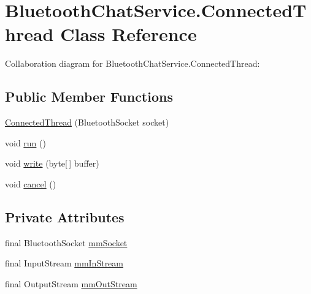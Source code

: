 \hypertarget{classcom_1_1example_1_1android_1_1_bluetooth_chat_1_1_bluetooth_chat_service_1_1_connected_thread}{\section{Bluetooth\-Chat\-Service.\-Connected\-Thread Class Reference}
\label{classcom_1_1example_1_1android_1_1_bluetooth_chat_1_1_bluetooth_chat_service_1_1_connected_thread}
}


Collaboration diagram for Bluetooth\-Chat\-Service.\-Connected\-Thread\-:
\subsection*{Public Member Functions}
\begin{DoxyCompactItemize}
\item 
\hyperlink{classcom_1_1example_1_1android_1_1_bluetooth_chat_1_1_bluetooth_chat_service_1_1_connected_thread_a8dc6fa71066e77167173b4e67439b691}{Connected\-Thread} (Bluetooth\-Socket socket)
\item 
void \hyperlink{classcom_1_1example_1_1android_1_1_bluetooth_chat_1_1_bluetooth_chat_service_1_1_connected_thread_a13a43e6d814de94978c515cb084873b1}{run} ()
\item 
void \hyperlink{classcom_1_1example_1_1android_1_1_bluetooth_chat_1_1_bluetooth_chat_service_1_1_connected_thread_ae29f62e52ac434bc0b80facee55ff1c8}{write} (byte\mbox{[}$\,$\mbox{]} buffer)
\item 
void \hyperlink{classcom_1_1example_1_1android_1_1_bluetooth_chat_1_1_bluetooth_chat_service_1_1_connected_thread_a02d5fa6b14e221f3012a794b905be166}{cancel} ()
\end{DoxyCompactItemize}
\subsection*{Private Attributes}
\begin{DoxyCompactItemize}
\item 
final Bluetooth\-Socket \hyperlink{classcom_1_1example_1_1android_1_1_bluetooth_chat_1_1_bluetooth_chat_service_1_1_connected_thread_a671e27e36a6f6af999136e22c3f98006}{mm\-Socket}
\item 
final Input\-Stream \hyperlink{classcom_1_1example_1_1android_1_1_bluetooth_chat_1_1_bluetooth_chat_service_1_1_connected_thread_ae7c454d2fc0ce6f92fdd1fcd81d7ee38}{mm\-In\-Stream}
\item 
final Output\-Stream \hyperlink{classcom_1_1example_1_1android_1_1_bluetooth_chat_1_1_bluetooth_chat_service_1_1_connected_thread_a9a465100719e615460bb572c11659783}{mm\-Out\-Stream}
\end{DoxyCompactItemize}


